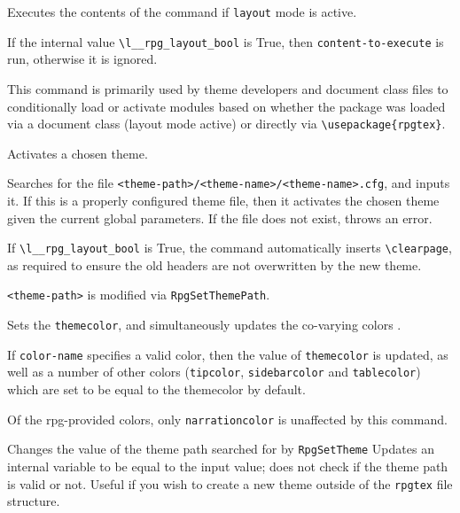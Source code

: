 		\begin{macrolist}
				{
					Executes the contents of the command if \verb|layout| mode is active.
				}
				{
				}
				{
					If the internal value \texttt{\textbackslash{}l\_\_rpg\_layout\_bool} is True, then \verb|content-to-execute| is run, otherwise it is ignored.

					This command is primarily used by theme developers and document class files to conditionally load or activate modules based on whether the package was loaded via a document class (layout mode active) or directly via \verb|\usepackage{rpgtex}|.
				}
				{
					Activates a chosen theme.
				}
				{
				}
				{
					Searches for the file \verb|<theme-path>/<theme-name>/<theme-name>.cfg|, and inputs it. If this is a properly configured theme file, then it activates the chosen theme given the current global parameters. If the file does not exist, throws an error.

					If   \texttt{\textbackslash{}l\_\_rpg\_layout\_bool} is True, the command automatically inserts \verb|\clearpage|, as required to ensure the old headers are not overwritten by the new theme.

					\verb|<theme-path>| is modified via \verb|RpgSetThemePath|.
				}

				{\label{Macro:SetThemeColor}
					Sets the \verb|themecolor|, and simultaneously updates the co-varying colors .
				}{
				}{
					If \verb|color-name| specifies a valid color, then the value of \verb|themecolor| is updated, as well as a number of other colors (\verb|tipcolor|, \verb|sidebarcolor| and \verb|tablecolor|) which are set to be equal to the themecolor by default.

					Of the rpg-provided colors, only \verb|narrationcolor| is unaffected by this command.
				}
				{
					Changes the value of the theme path searched for by \verb|RpgSetTheme|
				}
				{
				}
				{
					Updates an internal variable to be equal to the input value; does not check if the theme path is valid or not. Useful if you wish to create a new theme outside of the \verb|rpgtex| file structure.
				}
		\end{macrolist}
	